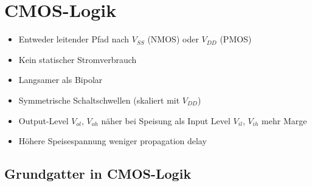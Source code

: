 \section{CMOS-Logik}

\begin{itemize}
    \item Entweder leitender Pfad nach $V_{SS}$ (NMOS) oder $V_{DD}$ (PMOS)
    \item Kein statischer Stromverbrauch
    \item Langsamer als Bipolar
    \item Symmetrische Schaltschwellen (skaliert mit $V_{DD}$)
    \item Output-Level $V_{ol}$, $V_{oh}$ näher bei Speisung als Input Level $V_{il}$, $V_{ih}$ \textrightarrow mehr Marge
    \item Höhere Speisespannung \textrightarrow weniger propagation delay
\end{itemize}


\subsection{Grundgatter in CMOS-Logik}

